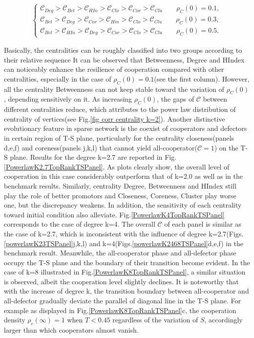\documentclass[preprint,12pt,3p]{elsarticle}
\begin{document}
\begin{eqnarray*}
\left\{
\begin{aligned}
\mathcal{C}_{Deg}>\mathcal{C}_{Bet}>\mathcal{C}_{HIn}>\mathcal{C}_{Clo}>\mathcal{C}_{Cor}>\mathcal{C}_{Clu}  \qquad \rho_{C}(0)=0.1,\\
\mathcal{C}_{Bet}>\mathcal{C}_{Deg}>\mathcal{C}_{Cor}>\mathcal{C}_{Hin}>\mathcal{C}_{Clo}>\mathcal{C}_{Clu}  \qquad \rho_{C}(0)=0.3,\\
\mathcal{C}_{Bet}>\mathcal{C}_{HIn}>\mathcal{C}_{Deg}>\mathcal{C}_{Cor}>\mathcal{C}_{Clo}>\mathcal{C}_{Clu}  \qquad \rho_{C}(0)=0.5.
\end{aligned}
\right.
\end{eqnarray*}

Basically, the centralities can be roughly classified into two groups according to their relative sequence
It can be observed that Betweenness, Degree and HIndex can noticeably enhance the resilience of cooperation
compared with other centralities, especially in the case of $\rho_{C}(0)=0.1$(see the first column).
However, all the centrality Betweenness can not keep stable toward the variation of $\rho_{C}(0)$,
depending sensitively on it.
As increasing $\rho_{C}(0)$, the gaps of $\mathcal{C}$ between different centralities reduce,
which attributes to the power law distribution of centrality of vertices(see Fig.\ref{fig corr centrality k=2}).
Another distinctive evolutionary feature in sparse network is the coexist of cooperators and defectors in certain
region of T-S plane, particularly for the centrality closeness(panels d,e,f) and coreness(panels j,k,l)
that cannot yield all-cooperator($\mathcal{C}=1$) on the T-S plane.
    Results for the degree k=2.7 are reported in Fig.\ref{PowerlawK2.7TopRankTSPanel}.
As plots clearly show, the overall level of cooperation in this case considerably outperform that of k=2.0
as well as in the benchmark results.
Similarly, centrality Degree, Betweenness and HIndex still play the role of better promotors
and Closeness, Coreness, Cluster play worse one, but the discrepancy weakens.
In addition, the sensitivity of each centrality toward initial condition also alleviate.
    Fig.\ref{PowerlawK4TopRankTSPanel} corresponds to the case of degree k=4.
The overall $\mathcal{C}$ of each panel is similar as the case of k=2.7,
which is inconsistent with the influence of degree k=2.7(Figs.\ref{powerlawK23TSPanel}j,k,l)
and k=4(Figs.\ref{powerlawK2468TSPanel}d,e,f) in the benchmark result.
Meanwhile, the all-cooperator phase and all-defector phase occupy the T-S plane and the
boundary of their transition become evident.
In the case of k=8 illustrated in Fig.\ref{PowerlawK8TopRankTSPanel},
a similar situation is observed, albeit the cooperation level slightly declines.
    It is noteworthy that with the increase of degree k, the transition boundary between
all-cooperator and all-defector gradually deviate the parallel of diagonal line in the T-S plane.
For example as displayed in Fig.\ref{PowerlawK8TopRankTSPanel}c, the cooperation density
$\rho_{c}(\infty)=1$ when $T<0.45$ regardless of the variation of $S$, accordingly larger than which
cooperators almost vanish.
\end{document}
